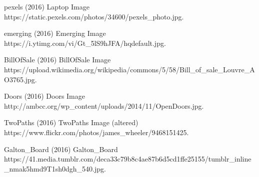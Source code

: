 \begin{frame}[allowframebreaks]
{\begin{thebibliography}{99}
 pexels (2016)
\newblock Laptop Image
\newblock https://static.pexels.com/photos/34600/pexels\_photo.jpg.

 emerging (2016)
\newblock Emerging Image
\newblock https://i.ytimg.com/vi/Gt\_5lS9hJFA/hqdefault.jpg.

 BillOfSale (2016)
\newblock BillOfSale Image
\newblock https://upload.wikimedia.org/wikipedia/commons/5/58/Bill\_of\_sale\_Louvre\_AO3765.jpg.

 Doors (2016)
\newblock Doors Image
\newblock http://ambcc.org/wp\_content/uploads/2014/11/OpenDoors.jpg.

 TwoPaths (2016)
\newblock TwoPaths Image (altered)
\newblock https://www.flickr.com/photos/james\_wheeler/9468151425.

 Galton\_Board (2016)
\newblock Galton\_Board
\newblock https://41.media.tumblr.com/deca33c79b8c4ae87b6d5cd1ffe25155/tumblr\_inline\_nmak5hmd9T1sh0dgh\_540.jpg.


\end{thebibliography}
}
\end{frame}

